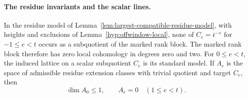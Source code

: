 \paragraph{The residue invariants and the scalar lines.}
\begin{proposition}
\label{prop:offwindow-scalar-residue-model}
In the residue model of Lemma~\ref{lem:largest-compatible-residue-model},
with heights and exclusions of Lemma~\ref{hyp:offwindow-local}, none of \(C_e=\bar\epsilon^{-e}\) for
\(-1\le e<t\) occurs as a subquotient of the marked rank block.
The marked rank block therefore has zero local cohomology in
degrees zero and two. For \(0\le e<t\), the induced lattice on a scalar
subquotient \(C_e\) is its standard model. If \(A_e\) is the space of admissible residue extension classes with trivial quotient and target \(C_e\), then
\[
 \dim A_0\le1,\qquad A_e=0\quad(1\le e<t).
\]
\end{proposition}

